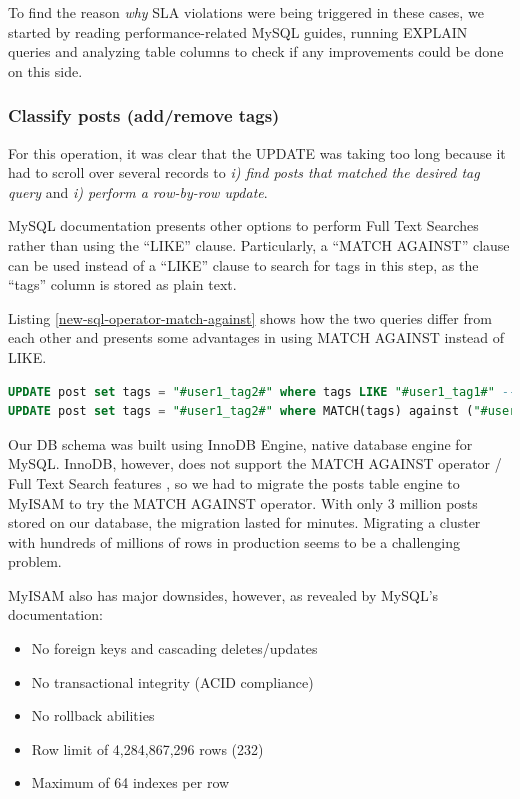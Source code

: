 To find the reason \textit{why} SLA violations were being triggered in these cases, we started by reading performance-related MySQL guides, running EXPLAIN queries and analyzing table columns to check if any improvements could be done on this side.

\subsubsection{Classify posts (add/remove tags)}
\label{classifypostssection}
For this operation, it was clear that the UPDATE was taking too long because it had to scroll over several records to \textit{i) find posts that matched the desired tag query} and \textit{i) perform a row-by-row update}.

MySQL documentation presents other options to perform Full Text Searches rather than using the ``LIKE'' clause. Particularly, a ``MATCH AGAINST'' clause can be used instead of a ``LIKE'' clause to search for tags in this step, as the ``tags'' column is stored as plain text. 

Listing \ref{new-sql-operator-match-against} shows how the two queries differ from each other and \cite{stackoverflowmatch} presents some advantages in using MATCH AGAINST instead of LIKE.

\begin{lstlisting}[language=SQL,firstnumber=1, caption=A new operator - MATCH AGAINST, label=new-sql-operator-match-against]
UPDATE post set tags = "#user1_tag2#" where tags LIKE "#user1_tag1#" -- old sentence
UPDATE post set tags = "#user1_tag2#" where MATCH(tags) against ("#user1_tag1#" IN BOOLEAN MODE) -- new sentence
\end{lstlisting} 

Our DB schema was built using InnoDB Engine, native database engine for MySQL. InnoDB, however, does not support the MATCH AGAINST operator / Full Text Search features \cite{ftsmysql}, so we had to migrate the posts table engine to MyISAM to try the MATCH AGAINST operator. With only 3 million posts stored on our database, the migration lasted for minutes. Migrating a cluster with hundreds of millions of rows in production seems to be a challenging problem. 

MyISAM also has major downsides, however, as revealed by MySQL's documentation: 
\begin{itemize}
\item{No foreign keys and cascading deletes/updates}
\item{No transactional integrity (ACID compliance)}
\item{No rollback abilities}
\item{Row limit of 4,284,867,296 rows (232)}
\item{Maximum of 64 indexes per row}
\end{itemize}
	

